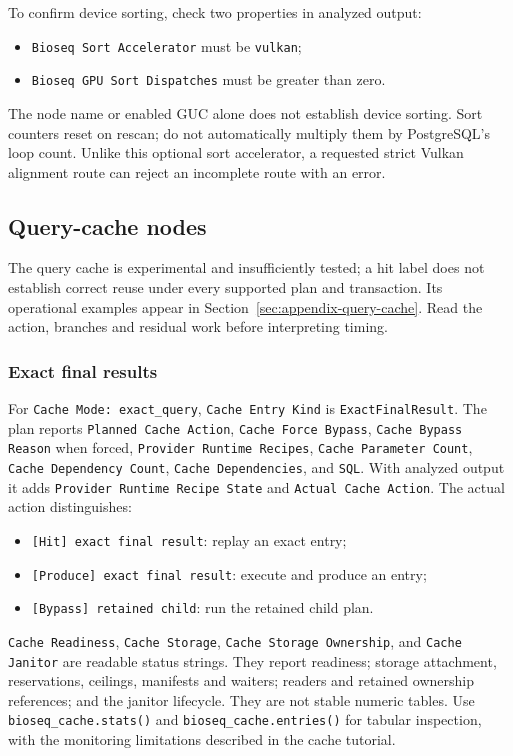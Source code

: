 To confirm device sorting, check two properties in analyzed output:
\begin{itemize}
  \item \texttt{Bioseq Sort Accelerator} must be \texttt{vulkan};
  \item \texttt{Bioseq GPU Sort Dispatches} must be greater than zero.
\end{itemize}
The node name or enabled GUC alone does not establish device sorting.
Sort counters reset on rescan;
do not automatically multiply them by PostgreSQL's loop count. Unlike this optional
sort accelerator, a requested strict Vulkan alignment route can reject an
incomplete route with an error.

\subsection{Query-cache nodes}

The query cache is experimental and insufficiently tested; a hit label does
not establish correct reuse under every supported plan and transaction.
Its operational examples appear in Section~\ref{sec:appendix-query-cache}.
Read the action, branches and residual work before interpreting timing.

\subsubsection{Exact final results}

For \texttt{Cache Mode: exact\_query},
\texttt{Cache Entry Kind} is \texttt{ExactFinalResult}. The plan reports
\texttt{Planned Cache Action}, \texttt{Cache Force Bypass},
\texttt{Cache Bypass Reason} when forced,
\texttt{Provider Runtime Recipes}, \texttt{Cache Parameter Count},
\texttt{Cache Dependency Count}, \texttt{Cache Dependencies}, and
\texttt{SQL}. With analyzed output it adds
\texttt{Provider Runtime Recipe State} and \texttt{Actual Cache Action}.
The actual action distinguishes:
\begin{itemize}
  \item \texttt{[Hit] exact final result}: replay an exact entry;
  \item \texttt{[Produce] exact final result}: execute and produce an entry;
  \item \texttt{[Bypass] retained child}: run the retained child plan.
\end{itemize}

\texttt{Cache Readiness}, \texttt{Cache Storage},
\texttt{Cache Storage Ownership}, and \texttt{Cache Janitor} are readable
status strings. They report readiness; storage attachment, reservations,
ceilings, manifests and waiters; readers and retained ownership references;
and the janitor lifecycle. They are not stable numeric tables. Use
\texttt{bioseq\_cache.stats()} and \texttt{bioseq\_cache.entries()} for tabular
inspection, with the monitoring limitations described in the cache tutorial.

